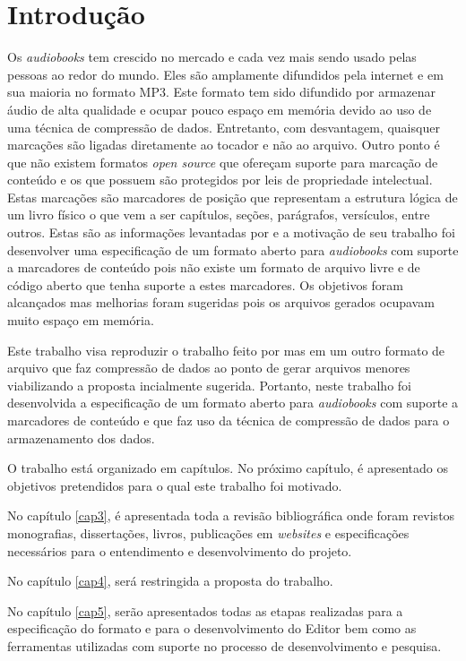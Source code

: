 \chapter[Introdução]{Introdução}\label{cap1}

Os \textit{audiobooks} tem crescido no mercado e cada vez mais sendo usado pelas pessoas ao redor do mundo. Eles são amplamente difundidos pela internet e em sua maioria no formato MP3. Este formato tem sido difundido por armazenar áudio de alta qualidade e ocupar pouco espaço em memória devido ao uso de uma técnica de compressão de dados. Entretanto, com desvantagem, quaisquer marcações são ligadas diretamente ao tocador e não ao arquivo. Outro ponto é que não existem formatos \textit{open source} que ofereçam suporte para marcação de conteúdo e os que possuem são protegidos por leis de propriedade intelectual. Estas marcações são marcadores de posição que representam a estrutura lógica de um livro físico o que vem a ser capítulos, seções, parágrafos, versículos, entre outros. Estas são as informações levantadas por \cite{herbert} e a motivação de seu trabalho foi desenvolver uma especificação de um formato aberto para \textit{audiobooks} com suporte a marcadores de conteúdo pois não existe um formato de arquivo livre e de código aberto que tenha suporte a estes marcadores. Os objetivos foram alcançados mas melhorias foram sugeridas pois os arquivos gerados ocupavam muito espaço em memória.

Este trabalho visa reproduzir o trabalho feito por \cite{herbert} mas em um outro formato de arquivo que faz compressão de dados ao ponto de gerar arquivos menores viabilizando a proposta incialmente sugerida. Portanto, neste trabalho foi desenvolvida a especificação de um formato aberto para \textit{audiobooks} com suporte a marcadores de conteúdo e que faz uso da técnica de compressão de dados para o armazenamento dos dados.

O trabalho está organizado em capítulos. No próximo capítulo, é apresentado os objetivos pretendidos para o qual este trabalho foi motivado.

No capítulo \ref{cap3}, é apresentada toda a revisão bibliográfica onde foram revistos monografias, dissertações, livros, publicações em \textit{websites} e especificações necessários para o entendimento e desenvolvimento do projeto.

No capítulo \ref{cap4}, será restringida a proposta do trabalho.

No capítulo \ref{cap5}, serão apresentados todas as etapas realizadas para a especificação do formato e para o desenvolvimento do Editor bem como as ferramentas utilizadas com suporte no processo de desenvolvimento e pesquisa.

